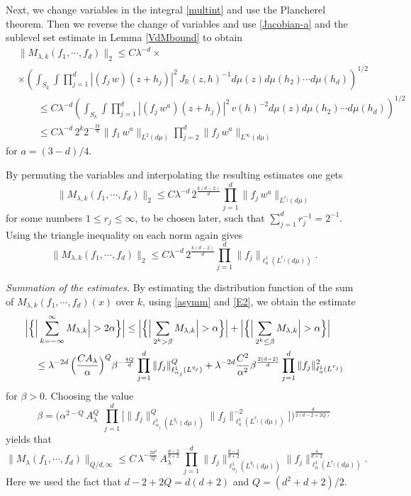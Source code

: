 \documentclass[11 pt]{amsart}
\theoremstyle{plain}
\numberwithin{equation}{section}
\theoremstyle{plain}
\numberwithin{equation}{section}
\theoremstyle{remark}
\begin{document}
Next, we change variables in the integral \eqref{multint} and use the Plancherel theorem. Then we reverse the change of variables and use
\eqref{Jacobian-a} and the sublevel set estimate in Lemma \ref{VdMbound} to
obtain
\begin{align*}\label{}
&\| M_{{\lambda}, k} (f_1, \cdots, f_d)\|_2 \le C{\lambda}^{-d} \times\\
&\times \left(\int_{S_k} \int \prod_{j=1}^d | (f_j\, w)(z+h_j) |^2 \, J_{{\mathbb {R}}} (z, h)^{-1} d\mu (z) d\mu (h_2)\cdots d\mu (h_d) \right)^{1/2} \\
&\qquad \le C{\lambda}^{-d} \left(\int_{S_k} \int \prod_{j=1}^d | (f_j \,w^a)(z+h_j) |^2 \,v(h)^{-2} d\mu (z) d\mu (h_2)\cdots d\mu (h_d) \right)^{1/2} \\
&\qquad \le C {\lambda}^{-d}
\,2^k 2^{-\frac{2k}{d}} \| f_1 \,w^a \|_{L^2 (d\mu )} \prod_{j=2}^d \| f_j\, w^a \|_{L^{\infty}(d\mu )}
\end{align*}
for $a=(3-d)/4$.

By permuting the variables and interpolating the resulting estimates one gets
\begin{equation*}\label{}
\| M_{{\lambda}, k} (f_1, \cdots, f_d)\|_2 \le C {\lambda}^{-d}
\,2^{\frac{k(d-2)}{d}} \prod_{j=1}^d \| f_j \,w^a \|_{L^{r_j}(d\mu )}
\end{equation*}
for some numbers $1\le r_j \le
\infty$, to be chosen later, such that $\sum_{j=1}^d r_j^{-1} = 2^{-1}$.
Using the triangle inequality on each norm again gives
\begin{equation}\label{E2}
\| M_{{\lambda}, k} (f_1, \cdots, f_d)\|_2 \le C {\lambda}^{-d}
\,2^{\frac{k(d-2)}{d}} \prod_{j=1}^d \| f_j \|_{\ell^1_a (L^{r_j}(d\mu ))} .
\end{equation}

{\sl Summation of the estimates.}
By estimating the distribution function of the sum of $M_{{\lambda}, k}(f_1, \cdots, f_d)(x)$ over $k$,
using \eqref{asymm} and \eqref{E2},
we obtain the estimate
\begin{align*}\label{}
\Big| \Big\{ &\Big|\sum_{k=-\infty}^\infty M_{{\lambda}, k} \Big| > 2\alpha  \Big\} \Big| \le \Big| \Big\{ \Big| \sum_{2^k > \beta} M_{{\lambda}, k} \Big| > \alpha \Big\} \Big| + \Big| \Big\{ \Big| \sum_{2^k \le \beta} M_{{\lambda}, k} \Big| > \alpha \Big\} \Big| \\
& \le {\lambda}^{-2d} \, \Big({CA_{\lambda}\over \alpha}\Big)^Q \beta^{-{4Q\over d}} \prod_{j=1}^d \| f_j \|_{\ell^1_{\alpha_j} (L^{q_j})}^Q + {\lambda}^{-2d} {C^2 \over \alpha^2} \beta^{\frac{2(d-2)}{d}} \prod_{j=1}^d \| f_j \|_{\ell^1_a (L^{r_j})}^2
\end{align*}
for $\beta >0$. Choosing the value
\[  \beta = \Big( \alpha^{2-Q} \, A_{\lambda}^Q \,
 \, \prod_{j=1}^d \Big[\| f_j \|_{\ell^1_{\alpha_j} (L^{q_j}(d\mu ))}^Q \| f_j \|_{\ell^1_a (L^{r_j}(d\mu ))}^{-2}\Big] \Big)^{\frac{d}{2(d-2+2Q)}}
\]
yields that
\[ \| M_{\lambda} (f_1, \cdots, f_d) \|_{Q/d, \infty} \le C \, {\lambda}^{-\frac{2 d^2}{Q}} \, A_{\lambda}^\frac{d-2}{d+2} \,
\prod_{j=1}^d \| f_j \|_{\ell^1_{\alpha_j} (L^{q_j}(d\mu ))}^\frac{d-2}{d+2}  \| f_j \|_{\ell^1_a (L^{r_j}(d\mu ))}^\frac{4}{d+2}.
\]
Here we used the fact that $d-2+2Q = d(d+2)$ and $Q = (d^2 + d +2) /2$.
\end{document}
